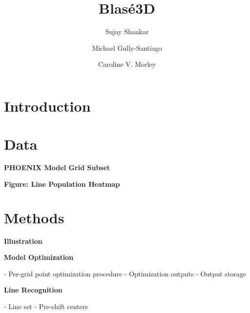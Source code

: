 \documentclass[twocolumn]{aastex631}
\begin{document}
\title{Blas\'e3D}

\author[0000-0002-2290-6810]{Sujay Shankar}
\author[0000-0002-4020-3457]{Michael Gully-Santiago}
\author[0000-0002-4404-0456]{Caroline V. Morley}

\begin{abstract}
    \blindtext
\end{abstract}

\keywords{}


\section{Introduction}
\blindtext


\section{Data}
\begin{mdframed}
    \textbf{PHOENIX Model Grid Subset}
    
    \textcolor{lightgray}{\blindtext}
\end{mdframed}

\begin{mdframed}
    \textbf{Figure: Line Population Heatmap}
\end{mdframed}


\section{Methods}
\begin{mdframed}
    \textbf{Illustration}
\end{mdframed}

\begin{mdframed}
    \textbf{Model Optimization}

    - Per-grid point optimization procedure
    - Optimization outputs
    - Output storage

    \textcolor{lightgray}{\blindtext}
\end{mdframed}

\begin{mdframed}
    \textbf{Line Recognition}

    - Line set
    - Pre-shift centers

    \textcolor{lightgray}{\blindtext}
\end{mdframed}
\end{document}
